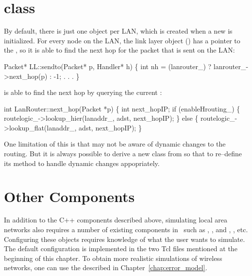 
\section{ class}
By default, there is just one  object per LAN, which
is created when a new  is initialized.  For every node
on the LAN, the link layer object () has a pointer to the
, so it is able to find the next hop for the packet
that is sent on the LAN:
\begin{program}
Packet* LL::sendto(Packet* p, Handler* h)
\{        
        int nh = (lanrouter_) ? lanrouter_->next_hop(p) : -1;
        . . .
\}
\end{program}
 is able to find the next hop by querying the current
:
\begin{program}
int LanRouter::next_hop(Packet *p) \{
        int next_hopIP;
        if (enableHrouting_) \{
                routelogic_->lookup_hier(lanaddr_, adst, next_hopIP);
        \} else \{
                routelogic_->lookup_flat(lanaddr_, adst, next_hopIP);
        \}
\end{program}
One limitation of this is that  may not be aware of
dynamic changes to the routing.  But it is always possible to derive a
new class from  so that to re--define its
 method to handle dynamic changes appopriately.

\section{Other Components}
\label{sec:lan_others}

In addition to the C++ components described above, simulating local area
networks also requires a number of existing components in \ns\ such as
, , and ,
, etc.  Configuring these
objects requires knowledge of what the user wants to simulate.  The
default configuration is implemented in the two Tcl files mentioned at
the beginning of this chapter.  To obtain more realistic simulations
of wireless networks, one can use the  described in
Chapter~\ref{chap:error_model}.

